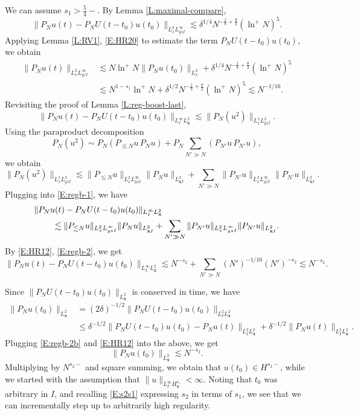 \documentclass[12pt,letterpaper]{amsart}
\newcommand{\indentalign}{\hspace{0.3in}&\hspace{-0.3in}}
\theoremstyle{remark}
\numberwithin{equation}{section}
\numberwithin{theorem}{section}
\numberwithin{table}{section}
\begin{document}
We can assume $s_1>\frac54-$.  By Lemma \ref{L:maximal-compare}, 
$$
\| P_N u(t) - P_N U(t-t_0) u(t_0) \|_{L_x^2 L_{yzI}^\infty} \lesssim \delta^{1/4} N^{-\frac18+ \frac{\theta}{2}} (\ln^+ N)^5.
$$
Applying Lemma \ref{L:RV1}, \eqref{E:HR20} to estimate the term $P_N U(t-t_0) u(t_0)$, we obtain
\begin{equation}
\label{E:regb-2}
\begin{aligned}
\|P_N u(t) \|_{L_x^2L_{yzI}^\infty} &\lesssim N \ln^+ N \|P_N u(t_0) \|_{L_x^2} +  \delta^{1/4} N^{-\frac18+ \frac{\theta}{2}} (\ln^+ N)^5 \\
&\lesssim N^{1-s_1} \ln^+ N  + \delta^{1/2} N^{-\frac18+\frac{\theta}{2}} (\ln^+ N)^5 \lesssim N^{-1/16}.
\end{aligned}
\end{equation}
Revisiting the proof of Lemma \ref{L:reg-boost-last}, 
\begin{equation}
\label{E:regb-1}
\| P_Nu(t)-P_NU(t-t_0) u(t_0)\|_{L_I^\infty L_{\mathbf{x}}^2} \lesssim \| P_N(u^2) \|_{L_x^1L_{yz I}^2}.
\end{equation}
Using the paraproduct decomposition
$$
P_N ( u^2) \sim P_N (P_{\lesssim N} u \, P_N u) + P_N \sum_{N'\gg N} (P_{N'}u \, P_{N'}u), 
$$
we obtain
$$
\| P_N (u^2) \|_{L_x^1 L_{yzI}^2} \lesssim \| P_{\lesssim N} u \|_{L_x^2L_{yzI}^\infty} 
\|P_N u \|_{L_{ \mathbf{x}I}^2} + \sum_{N'\gg N} \| P_{N'} u \|_{L_x^2L_{yzI}^\infty} 
\|P_{N'} u \|_{L_{\mathbf{x}I}^2}.
$$
Plugging into \eqref{E:regb-1}, we have
\begin{align*}
\indentalign \| P_Nu(t)-P_NU(t-t_0) u(t_0)\|_{L_I^\infty L_{\mathbf{x}}^2} \\
& \lesssim \| P_{\lesssim N} u \|_{L_x^2L_{yzI}^\infty} \|P_N u \|_{L_{\mathbf{x}I}^2} + \sum_{N'\gg N} \| P_{N'} u \|_{L_x^2L_{yzI}^\infty} \|P_{N'} u \|_{L_{\mathbf{x}I}^2}.
\end{align*}
By \eqref{E:HR12}, \eqref{E:regb-2}, we get
\begin{equation}
\label{E:regb-2b}
\| P_Nu(t)-P_NU(t-t_0) u(t_0)\|_{L_I^\infty L_{\mathbf{x}}^2}  \lesssim N^{-s_2} + \sum_{N' \gg N} (N')^{-1/16} (N')^{-s_2} \lesssim N^{-s_2}.
\end{equation}

Since $\| P_N U(t-t_0) u(t_0)\|_{L_{\mathbf{x}}^2}$ is conserved in time, we have
\begin{align*}
\|P_N u(t_0) \|_{L_{\mathbf{x}}^2} &= (2\delta)^{-1/2} \|P_N U(t-t_0) u(t_0) \|_{L_I^2 L_{\mathbf{x}}^2} \\
&\leq \delta^{-1/2} \|P_N U(t-t_0) u(t_0)- P_N u(t) \|_{L_I^2 L_{\mathbf{x}}^2} + \delta^{-1/2} \|P_N u(t) \|_{L_I^2 L_{\mathbf{x}}^2}.
\end{align*}
Plugging \eqref{E:regb-2b} and \eqref{E:HR12} into the above, we get
$$
\|P_N u(t_0) \|_{L_{\mathbf{x}}^2}  \lesssim N^{-s_2}.
$$
Multiplying by $N^{s_2-}$ and square summing, we obtain that $u(t_0) \in H^{s_2-}$, while we started with the assumption that $\|u \|_{L_I^\infty H_{\mathbf{x}}^{s_1}} < \infty$.  Noting that $t_0$ was arbitrary in $I$, and recalling \eqref{E:s2s1} expressing $s_2$ in terms of $s_1$, we see that we can incrementally step up to arbitrarily high regularity.  
\end{document}
